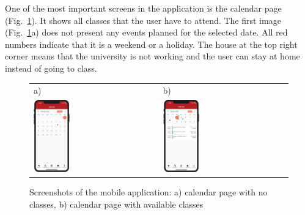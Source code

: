 One of the most important screens in the application is the calendar page (Fig.~\ref{fig:calendar-page}). It shows all classes that the user have to attend. The first image (Fig.~\ref{fig:calendar-page}a) does not present any events planned for the selected date. All red numbers indicate that it is a weekend or a holiday. The house at the top right corner means that the university is not working and the user can stay at home instead of going to class.
\begin{figure}[t]
    \centering
    \begin{tabular}{@{}ll@{}}
        a) & b) \\
        {\includegraphics[page=1,width=0.300\textwidth]{fig06/calendar_page_no_classes.png}} &
        {\includegraphics[page=7,width=0.300\textwidth]{fig06/calendar_page_with_classes.png}} \\
    \end{tabular}
    \caption{Screenshots of the mobile application: a) calendar page with no classes, b) calendar page with available classes} \label{fig:calendar-page}
\end{figure}


